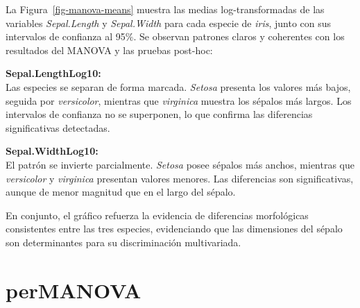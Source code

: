 \documentclass[
  spanish,
  11pt,
  a4paper,
  DIV=11,
  numbers=noendperiod]{scrartcl}
\begin{document}
La Figura~\ref{fig-manova-means} muestra las medias log-transformadas de
las variables \emph{Sepal.Length} y \emph{Sepal.Width} para cada especie
de \emph{iris}, junto con sus intervalos de confianza al 95\%. Se
observan patrones claros y coherentes con los resultados del MANOVA y
las pruebas post-hoc:

\textbf{Sepal.LengthLog10:}\\
Las especies se separan de forma marcada. \emph{Setosa} presenta los
valores más bajos, seguida por \emph{versicolor}, mientras que
\emph{virginica} muestra los sépalos más largos. Los intervalos de
confianza no se superponen, lo que confirma las diferencias
significativas detectadas.

\textbf{Sepal.WidthLog10:}\\
El patrón se invierte parcialmente. \emph{Setosa} posee sépalos más
anchos, mientras que \emph{versicolor} y \emph{virginica} presentan
valores menores. Las diferencias son significativas, aunque de menor
magnitud que en el largo del sépalo.

En conjunto, el gráfico refuerza la evidencia de diferencias
morfológicas consistentes entre las tres especies, evidenciando que las
dimensiones del sépalo son determinantes para su discriminación
multivariada.

\section{perMANOVA}\label{permanova}
\end{document}
